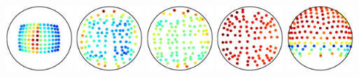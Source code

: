 \begin{minipage}{0.45\textwidth}
     \\
    \includegraphics[width=0.19\textwidth]{images/Dataset/real/diligent_direction.jpg}
    \includegraphics[width=0.19\textwidth]{images/Dataset/real/apple_direction.jpg}
    \includegraphics[width=0.19\textwidth]{images/Dataset/real/gourd1_direction.jpg}
    \includegraphics[width=0.19\textwidth]{images/Dataset/real/gourd2_direction.jpg}
    \includegraphics[width=0.19\textwidth]{images/Dataset/real/stage_direction.jpg}
\end{minipage}

